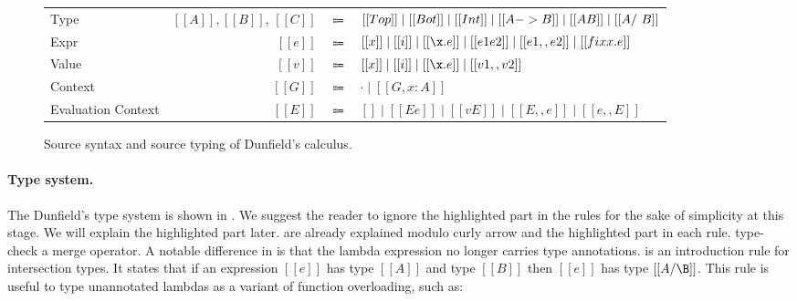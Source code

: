 \begin{figure}[!h]
  \begin{small}
  \begin{center}
    \begin{tabular}{lrcl} \toprule
      Type & $[[A]], [[B]]$, $[[C]]$ & $\Coloneqq$ & $ [[Top]] \mid [[Bot]] \mid [[Int]] \mid [[A -> B]] \mid [[A \/ B]] \mid [[A /\ B]] $ \\
      Expr & $[[e]]$ & $\Coloneqq$ & $[[x]] \mid [[i]] \mid [[\x.e]] \mid [[e1 e2]] \mid [[e1,,e2]] \mid [[fix x . e]] $\\
      Value & $[[v]]$ & $\Coloneqq$ & $[[x]] \mid [[i]] \mid [[\x.e]] \mid [[v1,,v2]] $\\
      Context & $[[G]]$ & $\Coloneqq$ & $ \cdot \mid [[G , x : A]]$ \\
      Evaluation Context & $[[E]]$ & $\Coloneqq$ & $[] \mid [[E e]] \mid [[v E]] \mid [[E,,e]] \mid [[e,,E]]$ \\
      \bottomrule
    \end{tabular}


    \end{center}
  \end{small}
  \caption{Source syntax and source typing of Dunfield's calculus.}
  \label{fig:merge:dunfield:syntax}
\end{figure}

\paragraph{Type system.}
The Dunfield's type system is shown in .
We suggest the reader to ignore the highlighted part in the rules
for the sake of simplicity
at this stage. We will explain the highlighted part later.
are already explained modulo curly arrow and the highlighted part
in each rule.
 type-check a merge operator.
A notable difference in  is that
the lambda expression no longer carries type annotations. 
 is an introduction rule for intersection types.
It states that if an expression $[[e]]$ has type $[[A]]$
and type $[[B]]$ then $[[e]]$ has type $[[A/\B]]$.
This rule is useful to type unannotated lambdas
as a variant of function overloading, such as:

